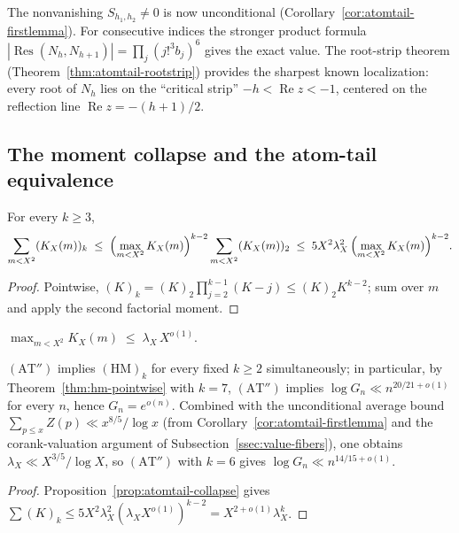 \begin{remark}
The nonvanishing $S_{h_1,h_2} \ne 0$ is now unconditional
(Corollary~\ref{cor:atomtail-firstlemma}).
For consecutive indices the stronger product formula
$|\operatorname{Res}(N_h,N_{h+1})|=\prod_j(j!^3b_j)^6$
gives the exact value.
The root-strip theorem
(Theorem~\ref{thm:atomtail-rootstrip})
provides the sharpest known localization:
every root of $N_h$ lies on the ``critical strip''
$-h < \operatorname{Re} z < -1$,
centered on the reflection line
$\operatorname{Re} z = -(h{+}1)/2$.
\end{remark}

\subsection{The moment collapse and the atom-tail equivalence}

\begin{proposition}\label{prop:atomtail-collapse}
For every $k\ge3$,
\[
 \sum_{m<X^2}(K_X(m))_k
 \;\le\;\Bigl(\max_{m<X^2}K_X(m)\Bigr)^{k-2}
 \sum_{m<X^2}(K_X(m))_2
 \;\le\;5X^2\lambda_X^2\,\Bigl(\max_{m<X^2}K_X(m)\Bigr)^{k-2}.
\]
\end{proposition}

\begin{proof}
Pointwise, $(K)_k=(K)_2\prod_{j=2}^{k-1}(K-j)\le(K)_2K^{k-2}$;
sum over $m$ and apply the second factorial moment.
\end{proof}

\begin{hypothesis}
\label{hyp:atomtail-at}
$\displaystyle\max_{m<X^2}K_X(m)\;\le\;\lambda_X\,X^{o(1)}.$
\end{hypothesis}

\begin{corollary}\label{cor:atomtail-at}
$(\mathrm{AT}'')$ implies $(\mathrm{HM})_k$ for every fixed
$k\ge2$ simultaneously; in particular, by
Theorem~\ref{thm:hm-pointwise} with $k=7$,
$(\mathrm{AT}'')$ implies
$\log G_n\ll n^{20/21+o(1)}$ for every $n$, hence
$G_n=e^{o(n)}$.
Combined with the unconditional average bound
$\sum_{p \le x} Z(p) \ll x^{8/5}/\log x$
(from Corollary~\ref{cor:atomtail-firstlemma} and
the corank-valuation argument of
Subsection~\ref{ssec:value-fibers}),
one obtains $\lambda_X \ll X^{3/5}/\log X$, so
$(\mathrm{AT}'')$ with $k = 6$ gives
$\log G_n \ll n^{14/15 + o(1)}$.
\end{corollary}

\begin{proof}
Proposition~\ref{prop:atomtail-collapse} gives
$\sum(K)_k\le5X^2\lambda_X^2(\lambda_XX^{o(1)})^{k-2}
=X^{2+o(1)}\lambda_X^k$.
\end{proof}

